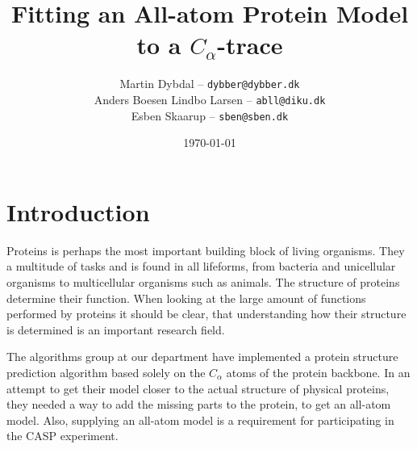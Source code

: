 \documentclass[10pt,a4paper,final,oneside,openany,article, twocolumn]{memoir}
\title{\vspace{-2cm}
  Fitting an All-atom Protein Model to a $C_\alpha$-trace\\
}
\author{
	Martin Dybdal -- \texttt{dybber@dybber.dk}\\
	Anders Boesen Lindbo Larsen -- \texttt{abll@diku.dk} \\
    Esben Skaarup -- \texttt{sben@sben.dk}
}
\date{\today}
\begin{document}

\tableofcontents

\chapter{Introduction}
Proteins is perhaps the most important building block of living
organisms. They a multitude of tasks and is found in all lifeforms,
from bacteria and unicellular organisms to multicellular organisms
such as animals. The structure of proteins determine their function. When looking at the large amount of functions
performed by proteins it should be clear, that understanding how their
structure is determined is an important research field.


The algorithms group at our department have implemented a protein
structure prediction algorithm based solely on the $C_\alpha$ atoms of
the protein backbone\cite{}. In an attempt to get their model closer
to the actual structure of physical proteins, they needed a way to add
the missing parts to the protein, to get an all-atom model.  Also,
supplying an all-atom model is a requirement for participating in the
CASP experiment\cite{caspwebsite}.
\end{document}
